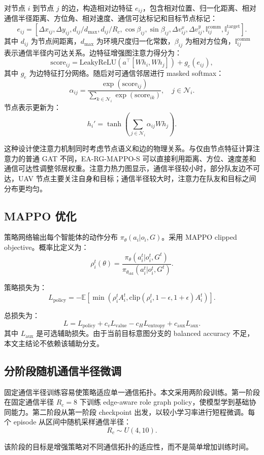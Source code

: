 对节点 $i$ 到节点 $j$ 的边，构造相对边特征 $e_{ij}$，包含相对位置、归一化距离、相对通信半径距离、方位角、相对速度、通信可达标记和目标节点标记：
\begin{equation}
e_{ij}=[\Delta x_{ij},\Delta y_{ij},d_{ij}/d_{\max},d_{ij}/R_c,
\cos\beta_{ij},\sin\beta_{ij},\Delta v^x_{ij},\Delta v^y_{ij},
\mathbb{I}_{ij}^{\mathrm{comm}},\mathbb{I}_{j}^{\mathrm{target}}].
\end{equation}
其中 $d_{ij}$ 为节点间距离，$d_{\max}$ 为环境尺度归一化常数，$\beta_{ij}$ 为相对方位角，$\mathbb{I}_{ij}^{\mathrm{comm}}$ 表示通信半径内可达关系。边特征增强图注意力得分为：
\begin{equation}
\mathrm{score}_{ij}=\mathrm{LeakyReLU}\left(a^\top[Wh_i,Wh_j]\right)+g_e(e_{ij}),
\end{equation}
其中 $g_e$ 为边特征打分网络。随后对可通信邻居进行 masked softmax：
\begin{equation}
\alpha_{ij}=\frac{\exp(\mathrm{score}_{ij})}{\sum_{k\in\mathcal{N}_i}\exp(\mathrm{score}_{ik})}, \quad j\in\mathcal{N}_i.
\end{equation}
节点表示更新为：
\begin{equation}
h_i'=\tanh\left(\sum_{j\in\mathcal{N}_i}\alpha_{ij}Wh_j\right).
\end{equation}

这种设计使注意力机制同时考虑节点语义和边的物理关系。与仅由节点特征计算注意力的普通 GAT 不同，EA-RG-MAPPO-S 可以直接利用距离、方位、速度差和通信可达性调整邻居权重。注意力热力图显示，通信半径较小时，部分队友边不可达，UAV 节点主要关注自身和目标；通信半径较大时，注意力在队友和目标之间分布更均匀。

\subsection{MAPPO 优化}

策略网络输出每个智能体的动作分布 $\pi_\theta(a_i|o_i,G)$。采用 MAPPO clipped objective。概率比定义为：
\begin{equation}
\rho_i^t(\theta)=\frac{\pi_\theta(a_i^t|o_i^t,G^t)}{\pi_{\theta_{\mathrm{old}}}(a_i^t|o_i^t,G^t)}.
\end{equation}

策略损失为：
\begin{equation}
L_{\mathrm{policy}}=-\mathbb{E}\left[\min\left(\rho_i^t A_i^t,\mathrm{clip}(\rho_i^t,1-\epsilon,1+\epsilon)A_i^t\right)\right].
\end{equation}

总损失为：
\begin{equation}
L=L_{\mathrm{policy}}+c_vL_{\mathrm{value}}-c_HL_{\mathrm{entropy}}+c_{\mathrm{aux}}L_{\mathrm{aux}}.
\end{equation}
其中 $L_{\mathrm{aux}}$ 是可选辅助损失。由于当前目标意图分支的 balanced accuracy 不足，本文主结论不依赖该辅助分支。

\subsection{分阶段随机通信半径微调}

固定通信半径训练容易使策略适应单一通信拓扑。本文采用两阶段训练。第一阶段在固定通信半径 $R_c=8$ 下训练 edge-aware role graph policy，使模型学到基础协同能力。第二阶段从第一阶段 checkpoint 出发，以较小学习率进行短程微调。每个 episode 从区间中随机采样通信半径：
\begin{equation}
R_c\sim U(4,10).
\end{equation}

该阶段的目标是增强策略对不同通信拓扑的适应性，而不是简单增加训练时间。
